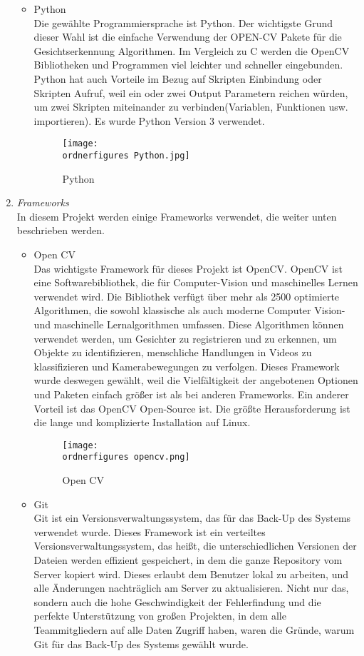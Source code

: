 \begin{enumerate}
\begin{itemize}
		\item Python \\
		Die gewählte Programmiersprache ist Python. Der wichtigste Grund dieser Wahl ist die einfache Verwendung der OPEN-CV Pakete für die Gesichtserkennung Algorithmen. Im Vergleich zu C werden die OpenCV Bibliotheken und Programmen viel leichter und schneller eingebunden. Python hat auch Vorteile im Bezug auf Skripten Einbindung oder Skripten Aufruf, weil ein oder zwei Output Parametern reichen würden, um zwei Skripten miteinander zu verbinden(Variablen, Funktionen usw. importieren). Es wurde Python Version 3 verwendet.
		\begin{figure}[H]
			\texttt{[image: \\ordnerfigures Python.jpg]}
			\centering
			\caption{Python\cite{PythonBild}}
		\end{figure}
	\end{itemize}
	\item \textit{Frameworks} \\
	In diesem Projekt werden einige Frameworks verwendet, die weiter unten beschrieben werden.
	\begin{itemize}
		\item Open CV \\
		Das wichtigste Framework für dieses Projekt ist OpenCV. OpenCV ist eine Softwarebibliothek, die für Computer-Vision und maschinelles Lernen verwendet wird. Die Bibliothek verfügt über mehr als 2500 optimierte Algorithmen, die sowohl klassische als auch moderne Computer Vision- und maschinelle Lernalgorithmen umfassen. Diese Algorithmen können verwendet werden, um Gesichter zu registrieren und zu erkennen, um Objekte zu identifizieren, menschliche Handlungen in Videos zu klassifizieren und Kamerabewegungen zu verfolgen. Dieses Framework wurde deswegen gewählt, weil die Vielfältigkeit der angebotenen Optionen und Paketen einfach größer ist als bei anderen Frameworks. Ein anderer Vorteil ist das OpenCV Open-Source ist. Die größte Herausforderung ist die lange und komplizierte Installation auf Linux.
		\cite{OpenCV}
		\begin{figure}[H]
			\texttt{[image: \\ordnerfigures opencv.png]}
			\centering
			\caption{Open CV\cite{OpenCVBild}}
		\end{figure}
		\item Git \\
		Git ist ein Versionsverwaltungssystem, das  für das Back-Up des Systems verwendet wurde. Dieses Framework ist ein verteiltes Versionsverwaltungssystem, das heißt, die unterschiedlichen Versionen der Dateien werden effizient gespeichert, in dem die ganze Repository vom Server kopiert wird. Dieses erlaubt dem Benutzer lokal zu arbeiten, und alle Änderungen nachträglich am Server zu aktualisieren. Nicht nur das, sondern auch die hohe Geschwindigkeit der Fehlerfindung und die perfekte Unterstützung von großen Projekten, in dem alle Teammitgliedern auf alle Daten Zugriff haben, waren die Gründe, warum Git für das Back-Up des Systems gewählt wurde.

\end{itemize}
\end{enumerate}
